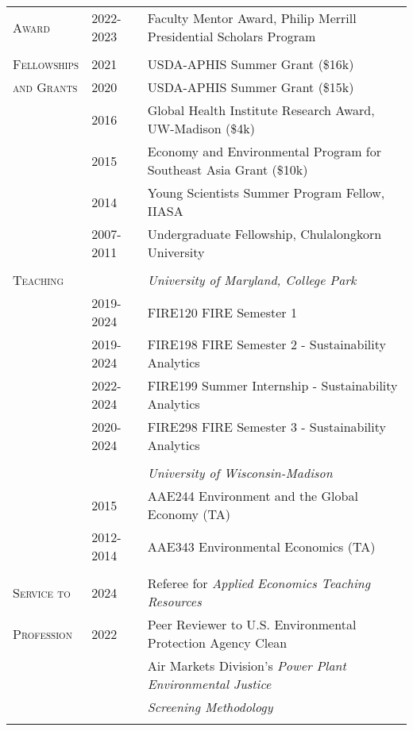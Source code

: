 \documentclass[letterpaper,11pt,oneside]{article}\usepackage[]{graphicx}\usepackage[]{xcolor}
\begin{document}
\noindent \begin{tabular}{p{1.2in} p{0.9in} l}     

\textsc{Award} & 2022-2023 & Faculty Mentor Award, Philip Merrill Presidential Scholars Program \\	
               & & \\
\textsc{Fellowships}	& 2021				& USDA-APHIS Summer Grant (\$16k) \\
\textsc{and Grants }	& 2020				& USDA-APHIS Summer Grant (\$15k) \\
                    	& 2016				& Global Health Institute Research Award, UW-Madison (\$4k) \\
                    	& 2015				& Economy and Environmental Program for Southeast Asia Grant (\$10k) \\
                    	& 2014				& Young Scientists Summer Program Fellow, IIASA \\
                    	& 2007-2011		& Undergraduate Fellowship, Chulalongkorn University \\
                    	& & \\        
\textsc{Teaching}     & & \textit{University of Maryland, College Park} \\
                      & 2019-2024     & FIRE120 FIRE Semester 1 \\
		                  & 2019-2024     & FIRE198 FIRE Semester 2 - Sustainability Analytics \\
                      & 2022-2024     & FIRE199 Summer Internship - Sustainability Analytics \\
				              & 2020-2024	    & FIRE298 FIRE Semester 3 - Sustainability Analytics \\
                      & & \\  
                      &               & \textit{University of Wisconsin-Madison} \\
				              & 2015          & AAE244 Environment and the Global Economy (TA) \\
				              & 2012-2014     & AAE343 Environmental Economics (TA)\\
                      & & \\
\textsc{Service to}   & 2024          & Referee for \textit{Applied Economics Teaching Resources} \\
\textsc{Profession}   & 2022          & Peer Reviewer to U.S. Environmental Protection Agency Clean \\
                      &               & Air Markets Division's \textit{Power Plant Environmental Justice} \\
                  		&               & \textit{Screening Methodology} \href{https://www.epa.gov/system/files/documents/2023-06/PPSM Final Peer Review Report.pdf}{\color{blue}{[LINK]}} \\
                      & & \\
\end{tabular}                      
\newpage                         
                      
\end{document}
